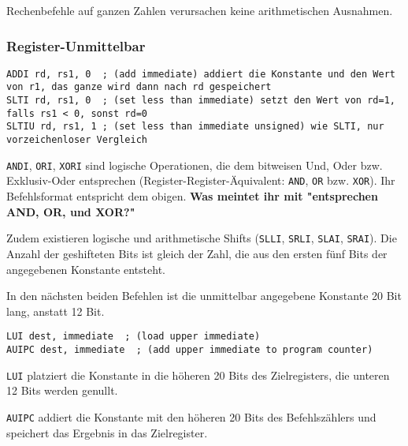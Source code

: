 
Rechenbefehle auf ganzen Zahlen verursachen keine arithmetischen Ausnahmen.

\subsubsection{Register-Unmittelbar}

\begin{lstlisting}[style=risc-v_Assembler]
ADDI rd, rs1, 0  ; (add immediate) addiert die Konstante und den Wert von r1, das ganze wird dann nach rd gespeichert
SLTI rd, rs1, 0  ; (set less than immediate) setzt den Wert von rd=1, falls rs1 < 0, sonst rd=0
SLTIU rd, rs1, 1 ; (set less than immediate unsigned) wie SLTI, nur vorzeichenloser Vergleich
\end{lstlisting}

\lstinline[style=risc-v_Assembler]!ANDI!, \lstinline[style=risc-v_Assembler]!ORI!, \lstinline[style=risc-v_Assembler]!XORI! sind logische Operationen, die dem bitweisen Und, Oder bzw. Exklusiv-Oder entsprechen (Register-Register-Äquivalent: \lstinline[style=risc-v_Assembler]!AND!, \lstinline[style=risc-v_Assembler]!OR! bzw. \lstinline[style=risc-v_Assembler]!XOR!). Ihr
Befehlsformat entspricht dem obigen. \textbf{Was meintet ihr mit "entsprechen AND, OR, und XOR?"}

Zudem existieren logische und arithmetische Shifts (\lstinline[style=risc-v_Assembler]!SLLI!, \lstinline[style=risc-v_Assembler]!SRLI!, \lstinline[style=risc-v_Assembler]!SLAI!, \lstinline[style=risc-v_Assembler]!SRAI!). Die Anzahl
der geshifteten Bits ist gleich der Zahl, die aus den ersten fünf Bits der angegebenen Konstante entsteht.

In den nächsten beiden Befehlen ist die unmittelbar angegebene Konstante 20 Bit lang, anstatt 12 Bit.

\begin{lstlisting}[style=risc-v_Assembler]
LUI dest, immediate  ; (load upper immediate)
AUIPC dest, immediate  ; (add upper immediate to program counter)
\end{lstlisting}

\lstinline[style=risc-v_Assembler]!LUI! platziert die Konstante in die höheren 20 Bits des Zielregisters, die unteren 12 Bits werden genullt.

\lstinline[style=risc-v_Assembler]!AUIPC! addiert die Konstante mit den höheren 20 Bits des Befehlszählers und speichert das Ergebnis in das Zielregister.

